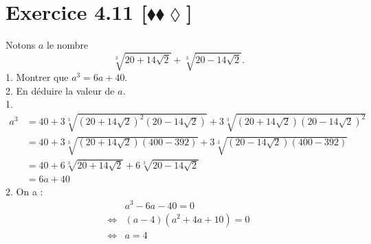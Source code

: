 \documentclass[10pt]{article}
\begin{document}
\section*{Exercice 4.11 [$\blacklozenge\blacklozenge\lozenge$]}
\begin{tcolorbox}[enhanced, width=7in, center, size=fbox, fontupper=\large, drop shadow southwest]
    Notons $a$ le nombre
    \begin{equation*}
        \sqrt[3]{20+14\sqrt{2}}+\sqrt[3]{20-14\sqrt{2}}.
    \end{equation*}
    1. Montrer que $a^3=6a+40$.\\
    2. En déduire la valeur de $a$.\\[0.25cm]
    1.
    \begin{align*}
        a^3&=40+3\sqrt[3]{(20+14\sqrt{2})^2(20-14\sqrt{2})}+3\sqrt[3]{(20+14\sqrt{2})(20-14\sqrt{2})^2}\\
        &=40+3\sqrt[3]{(20+14\sqrt{2})(400-392)}+3\sqrt[3]{(20-14\sqrt{2})(400-392)}\\
        &=40+6\sqrt[3]{20+14\sqrt{2}}+6\sqrt[3]{20-14\sqrt{2}}\\
        &=6a+40
    \end{align*}
    2. On a :
    \begin{align*}
        &a^3-6a-40=0\\
        \iff&(a-4)(a^2+4a+10)=0\\
        \iff&a=4
    \end{align*}
\end{tcolorbox}
\end{document}
